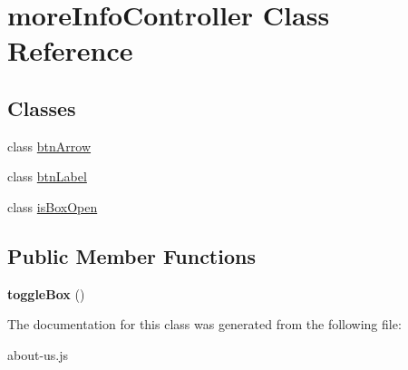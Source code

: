 \hypertarget{classmoreInfoController}{\section{more\-Info\-Controller Class Reference}
\label{classmoreInfoController}
}
\subsection*{Classes}
\begin{DoxyCompactItemize}
\item 
class \hyperlink{classmoreInfoController_1_1btnArrow}{btn\-Arrow}
\item 
class \hyperlink{classmoreInfoController_1_1btnLabel}{btn\-Label}
\item 
class \hyperlink{classmoreInfoController_1_1isBoxOpen}{is\-Box\-Open}
\end{DoxyCompactItemize}
\subsection*{Public Member Functions}
\begin{DoxyCompactItemize}
\item 
\hypertarget{classmoreInfoController_ae9443f55fe7b1a01855e09b2f3e4f91c}{{\bfseries toggle\-Box} ()}\label{classmoreInfoController_ae9443f55fe7b1a01855e09b2f3e4f91c}

\end{DoxyCompactItemize}


The documentation for this class was generated from the following file\-:\begin{DoxyCompactItemize}
\item 
about-\/us.\-js\end{DoxyCompactItemize}
